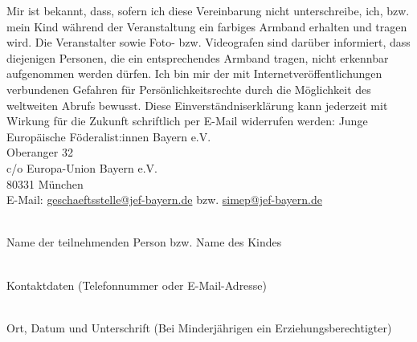 \documentclass[10pt]{article}
\begin{document}
Mir ist bekannt, dass, sofern ich diese Vereinbarung nicht unterschreibe, ich, bzw. mein Kind während der Veranstaltung ein farbiges Armband erhalten und tragen wird. Die Veranstalter sowie Foto- bzw. Videografen sind darüber informiert, dass diejenigen Personen, die ein entsprechendes Armband tragen, nicht erkennbar aufgenommen werden dürfen. \newline
Ich bin mir der mit Internetveröffentlichungen verbundenen Gefahren für Persönlichkeitsrechte durch die Möglichkeit des weltweiten Abrufs bewusst. \newline
Diese Einverständniserklärung kann jederzeit mit Wirkung für die Zukunft schriftlich per E-Mail widerrufen werden:\newline
\newline
Junge Europäische Föderalist:innen Bayern e.V.\\
Oberanger 32\\
c/o Europa-Union Bayern e.V.\\
80331 München\\
E-Mail: \href{mailto:geschaeftsstelle@jef-bayern.de}{geschaeftsstelle@jef-bayern.de} bzw. \href{mailto:simep@jef-bayern.de}{simep@jef-bayern.de}

\vspace{1cm}

\noindent\makebox[\linewidth]{\dotfill}\\
Name der teilnehmenden Person bzw. Name des Kindes

\vspace{.5cm}

\noindent\makebox[\linewidth]{\dotfill}\\
Kontaktdaten (Telefonnummer oder E-Mail-Adresse)

\vspace{.5cm}

\noindent\makebox[\linewidth]{\dotfill}\\
Ort, Datum und Unterschrift (Bei Minderjährigen ein Erziehungsberechtigter)

\vfill

\PlaceLogosOne
\end{document}
